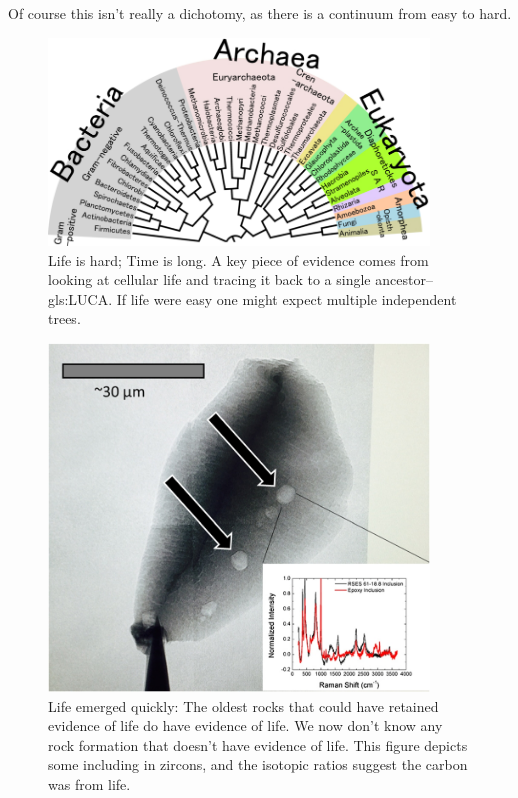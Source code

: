 \documentclass[]{article}
\begin{document}
Of course this isn't really a dichotomy, as there is a continuum from easy to hard.

\begin{figure}[H]
	\caption[Life is hard.]{Life is hard; Time is long. A key piece of evidence comes from looking at cellular life and tracing it back to a single ancestor--\gls{gls:LUCA}. If life were easy one might expect multiple independent trees.}\label{fig:luca} 
	\includegraphics[width=0.9\textwidth]{Luca}
\end{figure}

\begin{figure}[H]
	\caption[Life emerged quickly]{Life emerged quickly: The oldest rocks that could have retained evidence of life do have evidence of life. We now don't know any rock formation that doesn't have evidence of life. This figure depicts some including in zircons\cite{bell2015potentially}, and the isotopic ratios suggest the carbon was from life.}\label{fig:zircons} 
	\includegraphics[width=0.9\textwidth]{Zircons}
\end{figure}
\end{document}
